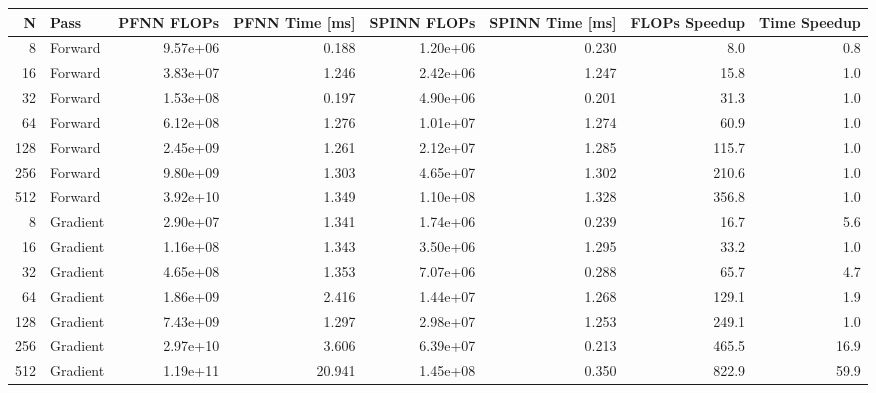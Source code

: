 \begin{tabular}{rlrrrrrr}
\toprule
N & Pass & PFNN FLOPs & PFNN Time [ms] & SPINN FLOPs & SPINN Time [ms] & FLOPs Speedup & Time Speedup \\
\midrule
8 & Forward & 9.57e+06 & 0.188 & 1.20e+06 & 0.230 & 8.0 & 0.8 \\
16 & Forward & 3.83e+07 & 1.246 & 2.42e+06 & 1.247 & 15.8 & 1.0 \\
32 & Forward & 1.53e+08 & 0.197 & 4.90e+06 & 0.201 & 31.3 & 1.0 \\
64 & Forward & 6.12e+08 & 1.276 & 1.01e+07 & 1.274 & 60.9 & 1.0 \\
128 & Forward & 2.45e+09 & 1.261 & 2.12e+07 & 1.285 & 115.7 & 1.0 \\
256 & Forward & 9.80e+09 & 1.303 & 4.65e+07 & 1.302 & 210.6 & 1.0 \\
512 & Forward & 3.92e+10 & 1.349 & 1.10e+08 & 1.328 & 356.8 & 1.0 \\
8 & Gradient & 2.90e+07 & 1.341 & 1.74e+06 & 0.239 & 16.7 & 5.6 \\
16 & Gradient & 1.16e+08 & 1.343 & 3.50e+06 & 1.295 & 33.2 & 1.0 \\
32 & Gradient & 4.65e+08 & 1.353 & 7.07e+06 & 0.288 & 65.7 & 4.7 \\
64 & Gradient & 1.86e+09 & 2.416 & 1.44e+07 & 1.268 & 129.1 & 1.9 \\
128 & Gradient & 7.43e+09 & 1.297 & 2.98e+07 & 1.253 & 249.1 & 1.0 \\
256 & Gradient & 2.97e+10 & 3.606 & 6.39e+07 & 0.213 & 465.5 & 16.9 \\
512 & Gradient & 1.19e+11 & 20.941 & 1.45e+08 & 0.350 & 822.9 & 59.9 \\
\bottomrule
\end{tabular}
